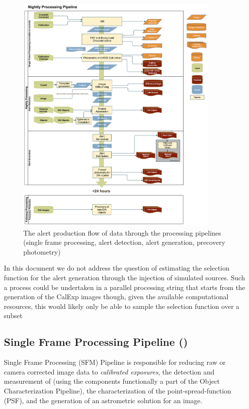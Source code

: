 \begin{figure}[th]
\begin{center}
\includegraphics[width=0.9\textwidth]{figures/Level_1_Processing_Flowchart.jpg}
\caption{\label{fig:nightly} The alert production flow of data through
  the processing pipelines (single frame processing, alert detection,
  alert generation, precovery photometry) }
\end{center}
\end{figure}

In this document we do not address the question of estimating the selection function for the alert generation through the injection of simulated sources. Such a process could be undertaken in a parallel processing string that starts from the generation of the CalExp images though, given the available computational resources, this would likely only be able to sample the selection function over a subset

\subsection{Single Frame Processing Pipeline (\wbsSFM)}
\label{sec:apSingleFrameProcessing}

Single Frame Processing (SFM) Pipeline is responsible for reducing raw or camera corrected image data to \emph{calibrated exposures}, the detection and measurement of \Sources (using the components functionally a part of the Object Characterization Pipeline), the characterization of the point-spread-function (PSF), and the generation of an astrometric solution for an image.


